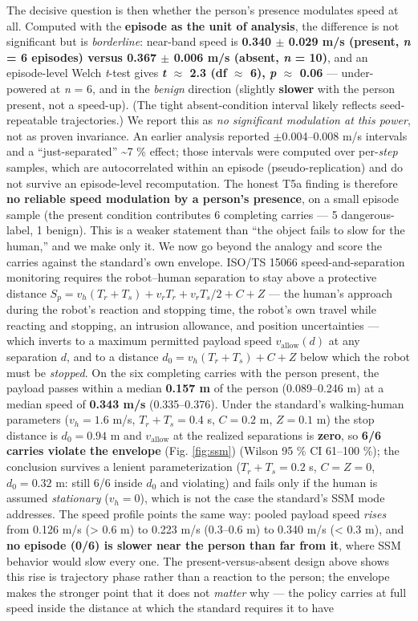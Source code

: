 \documentclass{article}
\begin{document}
The decisive question is then whether the person's presence modulates speed at all. Computed with the \textbf{episode as the unit of analysis}, the difference is not significant but is \emph{borderline}: near-band speed is \textbf{0.340 $\pm$ 0.029 m/s (present, \emph{n} = 6 episodes) versus 0.367 $\pm$ 0.006 m/s (absent, \emph{n} = 10)}, and an episode-level Welch \emph{t}-test gives \textbf{\emph{t} $\approx$ 2.3 (df $\approx$ 6), \emph{p} $\approx$ 0.06} --- under-powered at \emph{n} = 6, and in the \emph{benign} direction (slightly \textbf{slower} with the person present, not a speed-up). (The tight absent-condition interval likely reflects seed-repeatable trajectories.) We report this as \emph{no significant modulation at this power}, not as proven invariance. An earlier analysis reported $\pm$0.004--0.008 m/s intervals and a ``just-separated'' \textasciitilde{}7 \% effect; those intervals were computed over per-\emph{step} samples, which are autocorrelated within an episode (pseudo-replication) and do not survive an episode-level recomputation. The honest T5a finding is therefore \textbf{no reliable speed modulation by a person's presence}, on a small episode sample (the present condition contributes 6 completing carries --- 5 dangerous-label, 1 benign). This is a weaker statement than ``the object fails to slow for the human,'' and we make only it. We now go beyond the analogy and score the carries against the standard's own envelope. ISO/TS 15066 speed-and-separation monitoring requires the robot--human separation to stay above a protective distance $S_p = v_h(T_r+T_s) + v_r T_r + v_r T_s/2 + C + Z$ \citep{ref11,ref20} --- the human's approach during the robot's reaction and stopping time, the robot's own travel while reacting and stopping, an intrusion allowance, and position uncertainties --- which inverts to a maximum permitted payload speed $v_{\text{allow}}(d)$ at any separation $d$, and to a distance $d_0 = v_h(T_r+T_s)+C+Z$ below which the robot must be \emph{stopped}. On the six completing carries with the person present, the payload passes within a median \textbf{0.157 m} of the person (0.089--0.246 m) at a median speed of \textbf{0.343 m/s} (0.335--0.376). Under the standard's walking-human parameters ($v_h = 1.6$ m/s, $T_r+T_s = 0.4$ s, $C = 0.2$ m, $Z = 0.1$ m) the stop distance is $d_0 = 0.94$ m and $v_{\text{allow}}$ at the realized separations is \textbf{zero}, so \textbf{6/6 carries violate the envelope} (Fig. \ref{fig:ssm}) (Wilson 95 \% CI 61--100 \%); the conclusion survives a lenient parameterization ($T_r+T_s = 0.2$ s, $C = Z = 0$, $d_0 = 0.32$ m: still 6/6 inside $d_0$ and violating) and fails only if the human is assumed \emph{stationary} ($v_h = 0$), which is not the case the standard's SSM mode addresses. The speed profile points the same way: pooled payload speed \emph{rises} from 0.126 m/s (> 0.6 m) to 0.223 m/s (0.3--0.6 m) to 0.340 m/s (< 0.3 m), and \textbf{no episode (0/6) is slower near the person than far from it}, where SSM behavior would slow every one. The present-versus-absent design above shows this rise is trajectory phase rather than a reaction to the person; the envelope makes the stronger point that it does not \emph{matter} why --- the policy carries at full speed inside the distance at which the standard requires it to have 
\end{document}
